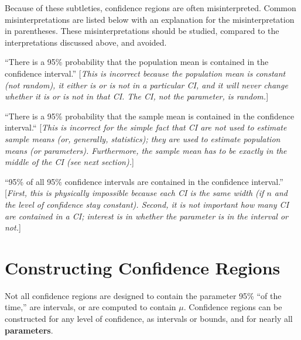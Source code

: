 \documentclass[10pt,openany]{book}\usepackage[]{graphicx}\usepackage[]{color}
\begin{document}
Because of these subtleties, confidence regions are often misinterpreted. Common misinterpretations are listed below with an explanation for the misinterpretation in parentheses. These misinterpretations should be studied, compared to the interpretations discussed above, and avoided.

\vspace*{-8pt}
\begin{Enumerate}
  \item ``There is a 95\% probability that the population mean is contained in the confidence interval.'' [\textit{This is incorrect because the population mean is constant (not random), it either is or is not in a particular CI, and it will never change whether it is or is not in that CI. The CI, not the parameter, is random.}]
  \item ``There is a 95\% probability that the sample mean is contained in the confidence interval.`` [\textit{This is incorrect for the simple fact that CI are not used to estimate sample means (or, generally, statistics); they are used to estimate population means (or parameters). Furthermore, the sample mean has to be exactly in the middle of the CI (see next section).}]
  \item ``95\% of all 95\% confidence intervals are contained in the confidence interval.'' [\textit{First, this is physically impossible because each CI is the same width (if $n$ and the level of confidence stay constant). Second, it is not important how many CI are contained in a CI; interest is in whether the parameter is in the interval or not.}]
\end{Enumerate}

\vspace{-12pt}

\vspace{-12pt}


\section{Constructing Confidence Regions} \label{sec:CIConstruct}
Not all confidence regions are designed to contain the parameter 95\% ``of the time,'' are intervals, or are computed to contain $\mu$. Confidence regions can be constructed for any level of confidence, as intervals or bounds, and for nearly all \textbf{parameters}.
\end{document}
